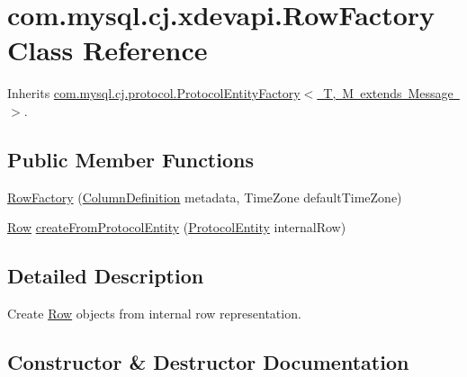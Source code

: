 \hypertarget{classcom_1_1mysql_1_1cj_1_1xdevapi_1_1_row_factory}{}\section{com.\+mysql.\+cj.\+xdevapi.\+Row\+Factory Class Reference}
\label{classcom_1_1mysql_1_1cj_1_1xdevapi_1_1_row_factory}


Inherits \mbox{\hyperlink{interfacecom_1_1mysql_1_1cj_1_1protocol_1_1_protocol_entity_factory}{com.\+mysql.\+cj.\+protocol.\+Protocol\+Entity\+Factory$<$ T, M extends Message $>$}}.

\subsection*{Public Member Functions}
\begin{DoxyCompactItemize}
\item 
\mbox{\hyperlink{classcom_1_1mysql_1_1cj_1_1xdevapi_1_1_row_factory_ab7f6ec55cd2bfd1989eebc0ee9ef3b4f}{Row\+Factory}} (\mbox{\hyperlink{interfacecom_1_1mysql_1_1cj_1_1protocol_1_1_column_definition}{Column\+Definition}} metadata, Time\+Zone default\+Time\+Zone)
\item 
\mbox{\hyperlink{interfacecom_1_1mysql_1_1cj_1_1result_1_1_row}{Row}} \mbox{\hyperlink{classcom_1_1mysql_1_1cj_1_1xdevapi_1_1_row_factory_a4320a0bcea400bcd2324daf031ee752f}{create\+From\+Protocol\+Entity}} (\mbox{\hyperlink{interfacecom_1_1mysql_1_1cj_1_1protocol_1_1_protocol_entity}{Protocol\+Entity}} internal\+Row)
\end{DoxyCompactItemize}


\subsection{Detailed Description}
Create \mbox{\hyperlink{interfacecom_1_1mysql_1_1cj_1_1xdevapi_1_1_row}{Row}} objects from internal row representation. 

\subsection{Constructor \& Destructor Documentation}
\mbox{\label{classcom_1_1mysql_1_1cj_1_1xdevapi_1_1_row_factory_ab7f6ec55cd2bfd1989eebc0ee9ef3b4f}} 
